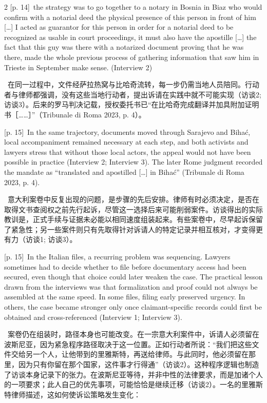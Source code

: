 \documentclass[10pt,a4paper]{article}
\begin{document}
\begin{paracol}{2}
\switchcolumn
{\scriptsize\color{gray} [p. 14]}\ the strategy was to go together to a notary in Bosnia in Biaz who would confirm with a notarial deed the physical presence of this person in front of him […] I acted as guarantor for this person in order for a notarial deed to be recognized as usable in court proceedings, it must also have the apostille […] the fact that this guy was there with a notarized document proving that he was there, made the whole previous process of gathering information that saw him in Trieste in September make sense. (Interview 2)\par
\switchcolumn*
{\scriptsize\color{gray} [p. 15]}\ 在同一过程中，文件经萨拉热窝与比哈奇流转，每一步仍需当地人员陪同。行动者与律师都强调，没有这些当地行动者，提出诉请在实践中就不可能实现（访谈2; 访谈3）。后来的罗马判决记载，授权委托书已“在比哈奇完成翻译并加具附加证明书［……］”（Tribunale di Roma 2023, p. 4）。\par
\switchcolumn
{\scriptsize\color{gray} [p. 15]}\ In the same trajectory, documents moved through Sarajevo and Bihać, local accompaniment remained necessary at each step, and both activists and lawyers stress that without those local actors, the appeal would not have been possible in practice (Interview 2; Interview 3). The later Rome judgment recorded the mandate as “translated and apostilled […] in Bihać” (Tribunale di Roma 2023, p. 4).\par
\switchcolumn*
{\scriptsize\color{gray} [p. 15]}\ 意大利案卷中反复出现的问题，是步骤的先后安排。律师有时必须决定，是否在取得文书查阅权之前先行起诉，尽管这一选择后来可能削弱案件。访谈得出的实际教训是，正式手续与证据未必能以相同速度组装起来。有些案卷中，尽早起诉保留了紧急性；另一些案件则只有先取得针对诉请人的特定记录并相互核对，才变得更有力（访谈1; 访谈3）。\par
\switchcolumn
{\scriptsize\color{gray} [p. 15]}\ In the Italian files, a recurring problem was sequencing. Lawyers sometimes had to decide whether to file before documentary access had been secured, even though that choice could later weaken the case. The practical lesson drawn from the interviews was that formalization and proof could not always be assembled at the same speed. In some files, filing early preserved urgency. In others, the case became stronger only once claimant-specific records could first be obtained and cross-referenced (Interview 1; Interview 3).\par
\switchcolumn*
{\scriptsize\color{gray} [p. 15]}\ 案卷仍在组装时，路径本身也可能改变。在一宗意大利案件中，诉请人必须留在波斯尼亚，因为紧急程序路径取决于这一位置。正如行动者所说：“我们把这些文件交给另一个人，让他带到的里雅斯特，再送给律师。与此同时，他必须留在那里，因为只有你留在那个国家，这件事才行得通”（访谈2）。这种程序逻辑也制造了访谈本身记录下的张力。在波斯尼亚等待，并非中性的法律要求，而是加诸个人的一项要求；此人自己的优先事项，可能恰恰是继续迁移（访谈2）。一名的里雅斯特律师描述，这如何使诉讼策略发生变化：\par

\end{paracol}
\end{document}
